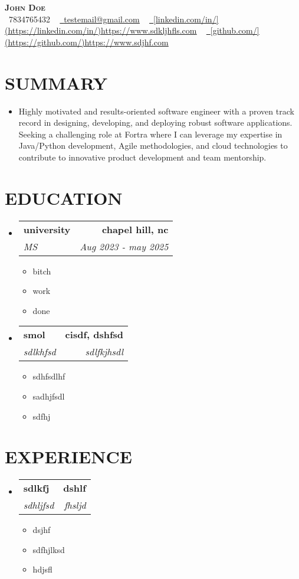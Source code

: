 \documentclass[letterpaper,11pt]{article}
\makeatletter
\newcommand{\resumeItem}[1]{\item\small{{#1 \vspace{-3pt}}}}
\newcommand{\resumeSubheading}[4]{\vspace{-2pt}\item\begin{tabular*}{0.97\textwidth}[t]{l@{\extracolsep{\fill}}r}\textbf{#1} & #2 \\\textit{\small#3} & \textit{\small #4} \\\end{tabular*}\vspace{-7pt}}
\newcommand{\resumeSubHeadingListStart}{\begin{itemize}[leftmargin=0.15in, label={}]}
\newcommand{\resumeSubHeadingListEnd}{\end{itemize}}
\newcommand{\resumeItemListStart}{\begin{itemize}}
\newcommand{\resumeItemListEnd}{\end{itemize}\vspace{-5pt}}
\makeatother
\begin{document}
\begin{center}
    \textbf{\Huge \scshape {\fontsize{15pt}{20pt}\selectfont John Doe}} \\ \vspace{1pt}
    \small \raisebox{-0.1\height}\faPhone\ 7834765432 ~ \href{mailto:testemail@gmail.com}{\raisebox{-0.2\height}\faEnvelope\  \underline{testemail@gmail.com}} ~ 
    \href{https://www.sdkljhfls.com}{\raisebox{-0.2\height}\faLinkedin\ \underline{[linkedin.com/in/](https://linkedin.com/in/)https://www.sdkljhfls.com}} ~ 
    \href{https://www.sdjhf.com}{\raisebox{-0.2\height}\faGithub\ \underline{[github.com/](https://github.com/)https://www.sdjhf.com}}
    \vspace{-8pt}
\end{center}

\section{{\fontsize{9pt}{20pt}\selectfont \textbf{SUMMARY}}}
\resumeSubHeadingListStart
\resumeItem{Highly motivated and results-oriented software engineer with a proven track record in designing, developing, and deploying robust software applications.  Seeking a challenging role at Fortra where I can leverage my expertise in Java/Python development, Agile methodologies, and cloud technologies to contribute to innovative product development and team mentorship.}
\resumeSubHeadingListEnd\vspace{-15pt}
\section{{\fontsize{9pt}{20pt}\selectfont \textbf{EDUCATION}}}
\resumeSubHeadingListStart
\resumeSubheading{university}{\textbf{chapel hill, nc}}{MS}{Aug 2023 - may 2025}
\resumeItemListStart
\resumeItem{bitch}
\resumeItem{work}
\resumeItem{done}
\resumeItemListEnd
\resumeSubheading{smol}{\textbf{cisdf, dshfsd}}{sdlkhfsd}{sdlfkjhsdl}
\resumeItemListStart
\resumeItem{sdhfsdlhf}
\resumeItem{sadhjfsdl}
\resumeItem{sdfhj}
\resumeItemListEnd
\resumeSubHeadingListEnd\vspace{-15pt}
\section{{\fontsize{9pt}{20pt}\selectfont \textbf{EXPERIENCE}}}
\resumeSubHeadingListStart
\resumeSubheading{sdlkfj}{\textbf{dshlf}}{sdhljfsd}{fhsljd}
\resumeItemListStart
\resumeItem{dsjhf}
\resumeItem{sdfhjlksd}
\resumeItem{hdjsfl}
\resumeItemListEnd
\resumeSubHeadingListEnd\vspace{-15pt}
\end{document}
